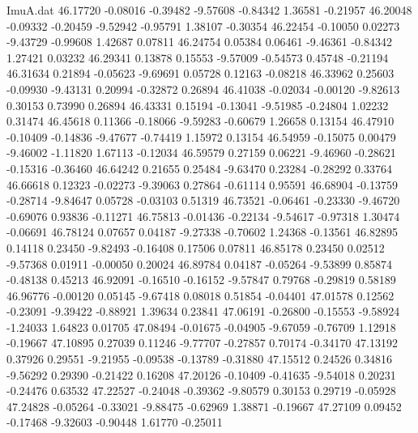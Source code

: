 \begin{filecontents}{ImuA.dat}
  46.17720   -0.08016   -0.39482   -9.57608   -0.84342    1.36581   -0.21957
  46.20048   -0.09332   -0.20459   -9.52942   -0.95791    1.38107   -0.30354
  46.22454   -0.10050    0.02273   -9.43729   -0.99608    1.42687    0.07811
  46.24754    0.05384    0.06461   -9.46361   -0.84342    1.27421    0.03232
  46.29341    0.13878    0.15553   -9.57009   -0.54573    0.45748   -0.21194
  46.31634    0.21894   -0.05623   -9.69691    0.05728    0.12163   -0.08218
  46.33962    0.25603   -0.09930   -9.43131    0.20994   -0.32872    0.26894
  46.41038   -0.02034   -0.00120   -9.82613    0.30153    0.73990    0.26894
  46.43331    0.15194   -0.13041   -9.51985   -0.24804    1.02232    0.31474
  46.45618    0.11366   -0.18066   -9.59283   -0.60679    1.26658    0.13154
  46.47910   -0.10409   -0.14836   -9.47677   -0.74419    1.15972    0.13154
  46.54959   -0.15075    0.00479   -9.46002   -1.11820    1.67113   -0.12034
  46.59579    0.27159    0.06221   -9.46960   -0.28621   -0.15316   -0.36460
  46.64242    0.21655    0.25484   -9.63470    0.23284   -0.28292    0.33764
  46.66618    0.12323   -0.02273   -9.39063    0.27864   -0.61114    0.95591
  46.68904   -0.13759   -0.28714   -9.84647    0.05728   -0.03103    0.51319
  46.73521   -0.06461   -0.23330   -9.46720   -0.69076    0.93836   -0.11271
  46.75813   -0.01436   -0.22134   -9.54617   -0.97318    1.30474   -0.06691
  46.78124    0.07657    0.04187   -9.27338   -0.70602    1.24368   -0.13561
  46.82895    0.14118    0.23450   -9.82493   -0.16408    0.17506    0.07811
  46.85178    0.23450    0.02512   -9.57368    0.01911   -0.00050    0.20024
  46.89784    0.04187   -0.05264   -9.53899    0.85874   -0.48138    0.45213
  46.92091   -0.16510   -0.16152   -9.57847    0.79768   -0.29819    0.58189
  46.96776   -0.00120    0.05145   -9.67418    0.08018    0.51854   -0.04401
  47.01578    0.12562   -0.23091   -9.39422   -0.88921    1.39634    0.23841
  47.06191   -0.26800   -0.15553   -9.58924   -1.24033    1.64823    0.01705
  47.08494   -0.01675   -0.04905   -9.67059   -0.76709    1.12918   -0.19667
  47.10895    0.27039    0.11246   -9.77707   -0.27857    0.70174   -0.34170
  47.13192    0.37926    0.29551   -9.21955   -0.09538   -0.13789   -0.31880
  47.15512    0.24526    0.34816   -9.56292    0.29390   -0.21422    0.16208
  47.20126   -0.10409   -0.41635   -9.54018    0.20231   -0.24476    0.63532
  47.22527   -0.24048   -0.39362   -9.80579    0.30153    0.29719   -0.05928
  47.24828   -0.05264   -0.33021   -9.88475   -0.62969    1.38871   -0.19667
  47.27109    0.09452   -0.17468   -9.32603   -0.90448    1.61770   -0.25011

\end{filecontents}
